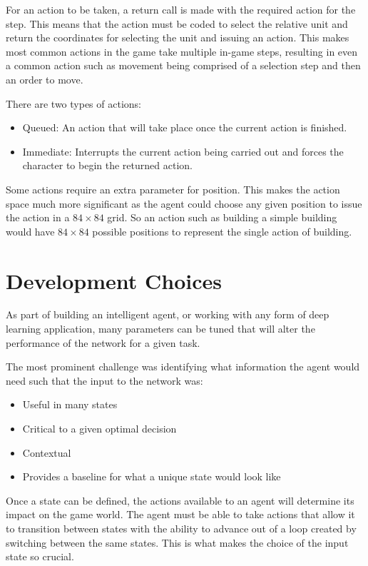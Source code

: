 For an action to be taken, a return call is made with the required action for
the step. This means that the action must be coded to select the relative unit
and return the coordinates for selecting the unit and issuing an action. This
makes most common actions in the game take multiple in-game steps, resulting in
even a common action such as movement being comprised of a selection step and
then an order to move.

There are two types of actions:

\begin{itemize}
    \item Queued: An action that will take place once the current
        action is finished.
    \item Immediate: Interrupts the current action being carried out and
        forces the character to begin the returned action.
\end{itemize}

Some actions require an extra parameter for position.
This makes the action space much more significant as the agent could choose any given
position to issue the action in a $84 \times 84$ grid.
So an action such as building a simple building would have $84 \times 84$
possible positions to represent the single action of building.

\section{Development Choices}

As part of building an intelligent agent, or working with any form of deep
learning application, many parameters can be tuned that will alter the
performance of the network for a given task.

The most prominent challenge was identifying what information the agent would
need such that the input to the network was:

\begin{itemize}
    \item Useful in many states
    \item Critical to a given optimal decision
    \item Contextual
    \item Provides a baseline for what a unique state would look like
\end{itemize}

Once a state can be defined, the actions available to an agent will determine its
impact on the game world. The agent must be able to take actions that allow it to
transition between states with the ability to advance out of a loop created
by switching between the same states. This is what makes the choice of the input
state so crucial.


